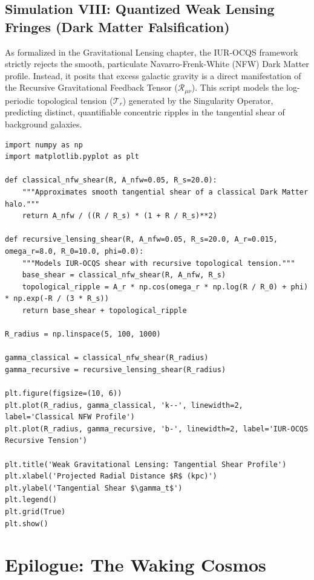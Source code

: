 \documentclass[12pt,openany]{book}
\begin{document}
\section{Simulation VIII: Quantized Weak Lensing Fringes (Dark Matter Falsification)}
As formalized in the Gravitational Lensing chapter, the IUR-OCQS framework strictly rejects the smooth, particulate Navarro-Frenk-White (NFW) Dark Matter profile. Instead, it posits that excess galactic gravity is a direct manifestation of the Recursive Gravitational Feedback Tensor ($\mathcal{R}_{\mu\nu}$). This script models the log-periodic topological tension ($\mathcal{T}_r$) generated by the Singularity Operator, predicting distinct, quantifiable concentric ripples in the tangential shear of background galaxies.

\begin{verbatim}
import numpy as np
import matplotlib.pyplot as plt

def classical_nfw_shear(R, A_nfw=0.05, R_s=20.0):
    """Approximates smooth tangential shear of a classical Dark Matter halo."""
    return A_nfw / ((R / R_s) * (1 + R / R_s)**2)

def recursive_lensing_shear(R, A_nfw=0.05, R_s=20.0, A_r=0.015, omega_r=8.0, R_0=10.0, phi=0.0):
    """Models IUR-OCQS shear with recursive topological tension."""
    base_shear = classical_nfw_shear(R, A_nfw, R_s)
    topological_ripple = A_r * np.cos(omega_r * np.log(R / R_0) + phi) * np.exp(-R / (3 * R_s))
    return base_shear + topological_ripple

R_radius = np.linspace(5, 100, 1000)

gamma_classical = classical_nfw_shear(R_radius)
gamma_recursive = recursive_lensing_shear(R_radius)

plt.figure(figsize=(10, 6))
plt.plot(R_radius, gamma_classical, 'k--', linewidth=2, label='Classical NFW Profile')
plt.plot(R_radius, gamma_recursive, 'b-', linewidth=2, label='IUR-OCQS Recursive Tension')

plt.title('Weak Gravitational Lensing: Tangential Shear Profile')
plt.xlabel('Projected Radial Distance $R$ (kpc)')
plt.ylabel('Tangential Shear $\gamma_t$')
plt.legend()
plt.grid(True)
plt.show()
\end{verbatim}

\chapter*{Epilogue: The Waking Cosmos}
\end{document}
